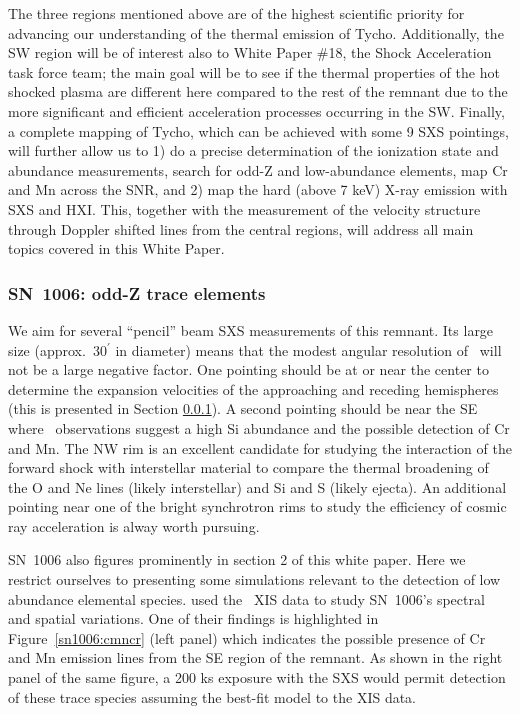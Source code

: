 \documentclass[11pt,a4paper]{article}
\begin{document}
{The three regions mentioned above are of the highest scientific priority
for advancing our understanding of the thermal emission of Tycho.
Additionally, the SW region will be of interest also to White Paper \#18, the
Shock Acceleration task force team; the main goal will be to see if
the thermal properties of the hot shocked plasma are different here
compared to the rest of the remnant due to the more significant and
efficient acceleration processes occurring in the SW.  
Finally, a complete mapping of Tycho, which can be achieved with
some 9 SXS pointings, will further allow us to 1) do a precise determination of
the ionization state and abundance measurements, search for odd-Z and low-abundance
elements, map Cr and Mn across the SNR, 
and 2) map the hard (above 7 keV) X-ray emission with SXS and HXI.
This, together with the measurement of the velocity structure through Doppler shifted lines 
from the central regions, will address all main topics covered in this White Paper.


\subsubsection{SN~1006: odd-Z trace elements} \label{subsec:sn1006}


We aim for several ``pencil'' beam SXS measurements of this remnant.
Its large size (approx.~30$^\prime$ in diameter) means that the modest
angular resolution of \ah\ will not be a large negative factor.  One
pointing should be at or near the center to determine the expansion
velocities of the approaching and receding hemispheres (this is
presented in Section \ref{subsec:sn1006}). A second pointing should be
near the SE where \suzaku\ observations suggest a high Si abundance
and the possible detection of Cr and Mn.  The NW rim is an excellent
candidate for studying the interaction of the forward shock with
interstellar material to compare the thermal broadening of the O and
Ne lines (likely interstellar) and Si and S (likely ejecta).  An
additional pointing near one of the bright synchrotron rims to study
the efficiency of cosmic ray acceleration is alway worth pursuing.

SN~1006 also figures prominently in section 2 of this white paper.
Here we restrict ourselves to presenting some simulations relevant to
the detection of low abundance elemental species. \citet{uchida13}
used the \suzaku\ XIS data to study SN~1006's spectral and spatial
variations.  One of their findings is highlighted in
Figure~\ref{sn1006:cmncr} (left panel) which indicates the possible
presence of Cr and Mn emission lines from the SE region of the
remnant.  As shown in the right panel of the same figure, a 200 ks
exposure with the SXS would permit detection of these trace species
assuming the best-fit model to the XIS data.

}
\end{document}
